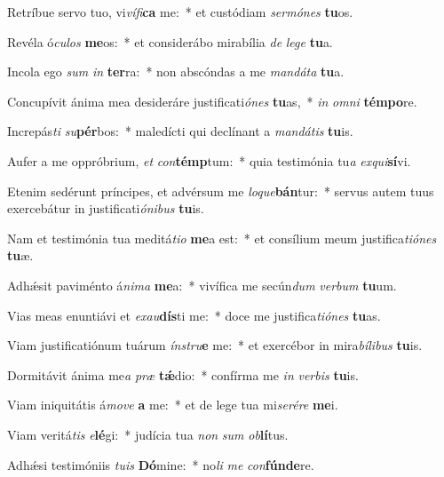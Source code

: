 \item Retríbue servo tuo, vi\textit{ví}\textit{fi}\textbf{ca} me:~* et custódiam \textit{ser}\textit{mó}\textit{nes} \textbf{tu}os.
\item Revéla ó\textit{cu}\textit{los} \textbf{me}os:~* et considerábo mirabília \textit{de} \textit{le}\textit{ge} \textbf{tu}a.
\item Incola ego \textit{sum} \textit{in} \textbf{ter}ra:~* non abscóndas a me \textit{man}\textit{dá}\textit{ta} \textbf{tu}a.
\item Concupívit ánima mea desideráre justificati\textit{ó}\textit{nes} \textbf{tu}as,~* \textit{in} \textit{om}\textit{ni} \textbf{tém}\textbf{po}re.
\item Increpás\textit{ti} \textit{su}\textbf{pér}bos:~* maledícti qui declínant a \textit{man}\textit{dá}\textit{tis} \textbf{tu}is.
\item Aufer a me oppróbrium, \textit{et} \textit{con}\textbf{témp}tum:~* quia testimónia tu\textit{a} \textit{ex}\textit{qui}\textbf{sí}vi.
\item Etenim sedérunt príncipes, et advérsum me \textit{lo}\textit{que}\textbf{bán}tur:~* servus autem tuus exercebátur in justificati\textit{ó}\textit{ni}\textit{bus} \textbf{tu}is.
\item Nam et testimónia tua meditá\textit{ti}\textit{o} \textbf{me}a est:~* et consílium meum justifica\textit{ti}\textit{ó}\textit{nes} \textbf{tu}æ.
\item Adhǽsit paviménto á\textit{ni}\textit{ma} \textbf{me}a:~* vivífica me secún\textit{dum} \textit{ver}\textit{bum} \textbf{tu}um.
\item Vias meas enuntiávi et \textit{ex}\textit{au}\textbf{dís}ti me:~* doce me justifica\textit{ti}\textit{ó}\textit{nes} \textbf{tu}as.
\item Viam justificatiónum tuárum \textit{ín}\textit{stru}\textbf{e} me:~* et exercébor in mira\textit{bí}\textit{li}\textit{bus} \textbf{tu}is.
\item Dormitávit ánima me\textit{a} \textit{præ} \textbf{tǽ}dio:~* confírma me \textit{in} \textit{ver}\textit{bis} \textbf{tu}is.
\item Viam iniquitátis á\textit{mo}\textit{ve} \textbf{a} me:~* et de lege tua mi\textit{se}\textit{ré}\textit{re} \textbf{me}i.
\item Viam veritá\textit{tis} \textit{e}\textbf{lé}gi:~* judícia tua \textit{non} \textit{sum} \textit{ob}\textbf{lí}tus.
\item Adhǽsi testimóniis \textit{tu}\textit{is} \textbf{Dó}mine:~* no\textit{li} \textit{me} \textit{con}\textbf{fún}\textbf{de}re.
